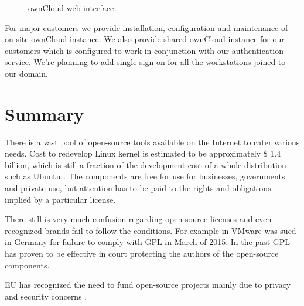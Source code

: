 \documentclass{article}
\begin{document}
\begin{figure}[!htb]
\centering
{}
\caption{ownCloud web interface}
\label{fig:owncloud}
\end{figure}

For major customers we provide installation,
configuration and maintenance of on-site ownCloud instance.
We also provide shared ownCloud instance
for our customers which is configured to work
in conjunction with our authentication service.
We're planning to add single-sign on
for all the workstations joined to our domain.



\section{Summary}

There is a vast pool of open-source tools available on the Internet
to cater various needs.
Cost to redevelop Linux kernel is estimated to be
approximately \$ 1.4 billion, which is still a fraction
of the development cost of a whole distribution such as Ubuntu
\cite{estimating-cost-of-linux-distro}.
The components are free for use for businesses, governments and
private use, but attention has to be paid to the rights
and obligations implied by a particular license.

There still is very much confusion regarding open-source licenses
and even recognized brands fail to follow the conditions.
For example in VMware was sued in Germany for failure to comply with GPL
\cite{vmware-sued} in March of 2015.
In the past GPL has proven to be effective in court protecting
the authors of the open-source components.

EU has recognized the need to fund open-source projects
mainly due to privacy and security concerns
\cite{eu-should-finance-open-source}.
\end{document}
